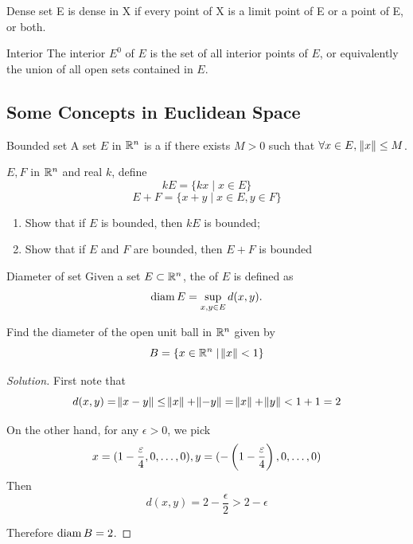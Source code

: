 \begin{defn}{Dense set}{}
E is dense in X if every point of X is a limit point of E or a point of E, or both.
\end{defn}

\begin{defn}{Interior}{}
The interior $E^0$ of $E$ is the set of all interior points of $E$, or equivalently the union of all open sets contained in $E$.
\end{defn}

\subsection{Some Concepts in Euclidean Space}
\begin{defn}{Bounded set}{}
A set $E$ in $\mathbb R^n$ is a  if there exists $M>0$ such that $\forall x \in E,\:\norm{x} \le M$.
\end{defn}

\begin{prbm}
$E,F$ in $\mathbb R^n$ and real $k$, define
\[ kE = \{kx \mid x \in E\} \]
\[ E+F = \{x+y \mid x \in E,y \in F\} \]
\begin{enumerate}[label=(\alph*)]
\item Show that if $E$ is bounded, then $kE$ is bounded;
\item Show that if $E$ and $F$ are bounded, then $E+F$ is bounded
\end{enumerate}
\end{prbm}

\begin{defn}{Diameter of set}
Given a set $E \subset \mathbb R^n$, the  of $E$ is defined as 
\[ \operatorname{diam} E = \sup_{x,y\in E} d(x,y). \]
\end{defn}

\begin{prbm}
Find the diameter of the open unit ball in $\mathbb R^n$ given by
\[ B = \{x \in \mathbb R^n \mid \norm{x}<1\} \]
\end{prbm}

\begin{proof}[Solution]
First note that
\[ d(x,y) = \norm{x-y} \le \norm{x}+\norm{-y} = \norm{x}+\norm{y} <1+1=2 \]

On the other hand, for any $\epsilon>0$, we pick
\[ x=(1-\frac{\varepsilon}{4},0,\dots,0), y=(-\left(1-\frac{\varepsilon}{4}\right),0,\dots,0) \]
Then
\[ d(x,y) = 2-\frac{\epsilon}{2} > 2-\epsilon \]

Therefore $\operatorname{diam} B = 2$.
\end{proof}

